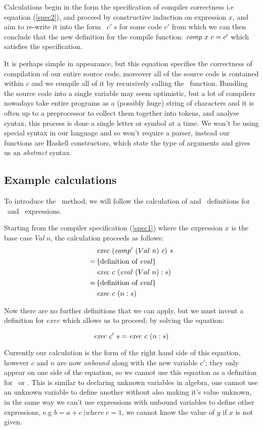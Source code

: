 \documentclass {article}
\begin{document}
Calculations begin in the form the 
specification of compiler correctness i.e equation (\ref{spec2}),
and proceed by constructive induction on expression $x$, 
and aim to re-write it into the form
\exec\  $c'\  s$ for some code $c'$
from which we can then conclude that the new definition
for the compile function: \( \mathit{comp\ }  x\  c = c' \) 
which satisfies the specification\cite{bandh}.

It is perhaps simple in appearance,
but this equation
specifies the correctness of compilation of our entire source code,
moreover all of the source code is contained within  $c$
and we compile all of it by recursively calling the \compp\ function.
Bundling the source code into a 
single variable may seem optimistic, but a lot of compilers nowadays 
take entire programs as a (possibly huge) string of characters
and it is often up to a preprocessor to collect 
them together into tokens, and analyse syntax, 
this process is done a single letter or symbol at a time\cite{dragon}.
We won't be using special syntax in our language and so won't
require a parser, instead our functions are  Haskell constructors, 
which state the type of arguments and gives us an \emph{abstract} syntax.

\subsection{Example calculations}

To introduce the \BH\ method,
we will follow the 
calculation of \comp and \exec\ definitions
for \val\ and \add\ expressions\cite[section 2.5]{bandh}.

Starting from the compiler specification (\ref{spec1})
where the expression $x$
is the base case $Val\ n$, 
the calculation proceeds as follows\cite{bandh}:
\begin{align*}
&\mathit{exec\ } (\mathit{comp'\ } (Val\ n)\ c)\ s \\
=\, & \{ \mbox{definition of \textit{eval}} \} \\
&\mathit{exec\ } c\ (\mathit{eval\ } (Val\ n) : s) \\
=\, & \{ \mbox{definition of \textit{eval}} \} \\
&\mathit{exec\ } c\ (n:s)
\end{align*}

Now there are no further definitions that we can apply,
but we must invent a definition for $exec$ which allows
us to proceed; by solving the equation:

\[ \mathit{exec\ }  c'\ s = \mathit{exec\ }  c\ (n : s) \]

Currently our calculation is the form of
the right hand side of this equation,
however $c$ and $n$ are now \emph{unbound}
along with the new variable $c'$;
they only appear on one side of the equation,
so we cannot use this equation as a definition
for \exec\ or \comp.
This is similar to declaring unknown variables 
in algebra, one cannot use an unknown variable to define
another without also making it's value unknown,
in the same way we can't use expressions with
unbound variables to define other expressions,
e.g \(b = a + c\ | \textit{where}\ c = 1\), we cannot
know the value of $y$ if $x$ is not given.
\end{document}
